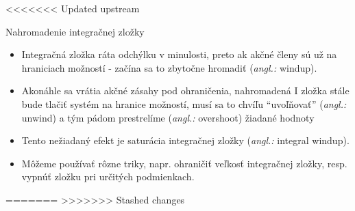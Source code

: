 \documentclass{beamer}
\newcommand{\angl}[1]{{\color{gray}(\emph{angl.:} #1)}}
\begin{document}
<<<<<<< Updated upstream
\begin{frame}[t]{Nahromadenie integračnej zložky}
  \begin{itemize}
    \item<1-> Integračná zložka ráta odchýlku v minulosti, preto ak akčné členy sú už na hraniciach možností - začína sa to zbytočne hromadiť \angl{windup}.
    \item<2-> Akonáhle sa vrátia akčné zásahy pod ohraničenia, nahromadená I zložka stále bude tlačiť systém na hranice možností, musí sa to chvíľu ``uvoľňovať'' \angl{unwind} a tým pádom prestrelíme \angl{overshoot} žiadané hodnoty
    \item<3-> Tento nežiadaný efekt je saturácia integračnej zložky \angl{integral windup}.
    \item<4-> Môžeme používať rôzne triky, napr. ohraničiť veľkosť integračnej zložky, resp. vypnúť zložku pri určitých podmienkach.
  \end{itemize}
\end{frame}
=======
>>>>>>> Stashed changes
\end{document}
